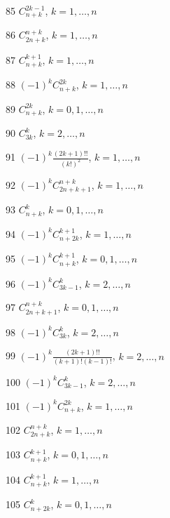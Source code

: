 \documentclass[11pt, russian]{article}
\begin{document}
85 
$C_{n+k}^{2k-1}$, $k=1,\ldots,n$\par

86 
$C_{2n+k}^{n+k}$, $k=1,\ldots,n$\par

87 
$C_{n+k}^{k+1}$, $k=1,\ldots,n$\par

88 
$(-1)^{k}C_{n+k}^{2k}$, $k=1,\ldots,n$\par

89 
$C_{n+k}^{2k}$, $k=0,1,\ldots,n$\par

90 
$C_{3k}^{k}$, $k=2,\ldots,n$\par

91 
$(-1)^{k}\frac{(2k+1)!!}{(k!)^2}$, $k=1,\ldots,n$\par

92 
$(-1)^{k}C_{2n+k+1}^{n+k}$, $k=1,\ldots,n$\par

93 
$C_{n+k}^{k}$, $k=0,1,\ldots,n$\par

94 
$(-1)^{k}C_{n+2k}^{k+1}$, $k=1,\ldots,n$\par

95 
$(-1)^{k}C_{n+k}^{k+1}$, $k=0,1,\ldots,n$\par

96 
$(-1)^{k}C_{3k-1}^{k}$, $k=2,\ldots,n$\par

97 
$C_{2n+k+1}^{n+k}$, $k=0,1,\ldots,n$\par

98 
$(-1)^{k}C_{3k}^{k}$, $k=2,\ldots,n$\par

99 
$(-1)^{k}\frac{(2k+1)!!}{(k+1)!(k-1)!}$, $k=2,\ldots,n$\par

100 
$(-1)^{k}C_{3k-1}^{k}$, $k=2,\ldots,n$\par

101 
$(-1)^{k}C_{n+k}^{2k}$, $k=1,\ldots,n$\par

102 
$C_{2n+k}^{n+k}$, $k=1,\ldots,n$\par

103 
$C_{n+k}^{k+1}$, $k=0,1,\ldots,n$\par

104 
$C_{n+k}^{k+1}$, $k=1,\ldots,n$\par

105 
$C_{n+2k}^{k}$, $k=0,1,\ldots,n$\par
\end{document}
